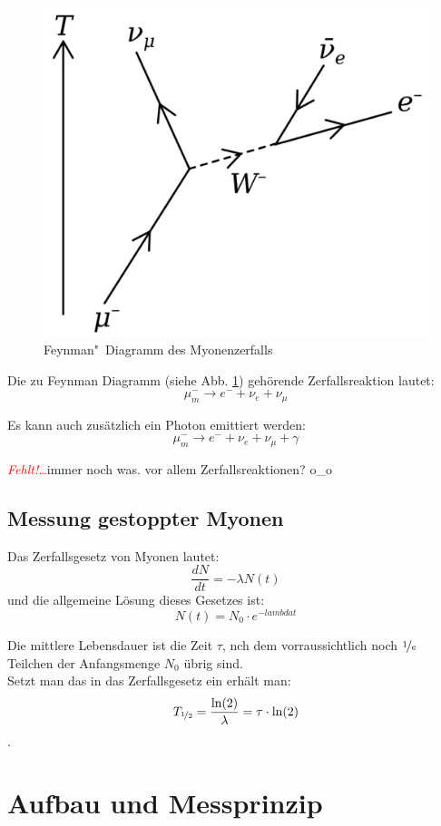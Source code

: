 \documentclass[12pt,a4paper,ngerman]{report}
\providecommand{\fehlt}{\textcolor{red}{\emph{Fehlt!\dots}}}
\begin{document}
		\begin{figure}[ht]
		\centering
		\includegraphics[width=.7\textwidth]{Bilder/Feynman_Myon}		
		\caption{Feynman"~Diagramm des Myonenzerfalls}
		\label{fig:Feynman_Myon}
	\end{figure}
	
	Die zu Feynman Diagramm (siehe Abb. \ref{fig:Feynman_Myon}) gehörende Zerfallsreaktion lautet:
	\[\mu^{-}_{m} \rightarrow e^{-} + \nu_e + \nu_{\mu} \]
	
	Es kann auch zusätzlich ein Photon emittiert werden:
	\[\mu^{-}_{m} \rightarrow e^{-} + \nu_e + \nu_{\mu} + \gamma \]
	
	
	\fehlt immer noch was. vor allem Zerfallsreaktionen? o\_o
	\section{Messung gestoppter Myonen}
		Das Zerfallsgesetz von Myonen lautet:
		\[\frac{dN}{dt}= -\lambda N(t)\]
		und die allgemeine Lösung dieses Gesetzes ist:
		\[N(t) = N_0 \cdot e^{-lambda t}\]
		
		Die mittlere Lebensdauer ist die Zeit $\tau$, nch dem vorraussichtlich noch $\nicefrac{1}{e}$ Teilchen der Anfangsmenge $N_0$ übrig sind. \\
		Setzt man das in das Zerfallsgesetz ein erhält man:
		\[T_{\nicefrac{1}{2}} = \frac{\ln(2)}{\lambda} = \tau \cdot \ln(2) \].
		

\chapter{Aufbau und Messprinzip}
\end{document}
